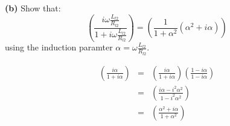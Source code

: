 \textbf{(b)} Show that:
$$
 \left(\frac{i\omega \frac{L_{l2}}{R_{l2}}}{1+i\omega\frac{L_{l2}}{R_{l2}}}\right) = \left(\frac{1}{1+\alpha^2}(\alpha^2+i\alpha) \right)
$$
using the induction paramter $\alpha = \omega \frac{L_{l2}}{R_{l2}}$.
\ifanswers
    \begin{tcolorbox}[enhanced jigsaw,breakable,pad at break*=1mm,
    colback=blue!5!white,colframe=babyblueeyes,title=Solutions,
    watermark color=white]
    \begin{eqnarray*}
        \left(\frac{i\alpha}{1+i\alpha}\right) &=& \left(\frac{i\alpha}{1+i\alpha}\right)\left(\frac{1-i\alpha}{1-i\alpha}\right) \\
        &=&\left(\frac{i\alpha-i^2\alpha^2}{1-i^2\alpha^2}\right) \\
        &=&\left(\frac{\alpha^2+i\alpha}{1+\alpha^2}\right)
    \end{eqnarray*}
        
\end{tcolorbox}
\fi

